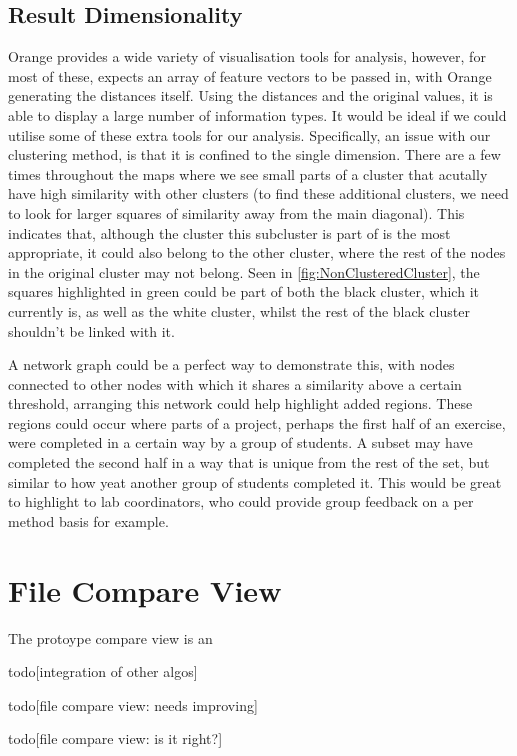 \subsection{Result Dimensionality}
\label{sec:VisTech}
Orange provides a wide variety of visualisation tools for analysis, however,
for most of these, expects an array of feature vectors to be passed in, with
Orange generating the distances itself. Using the distances and the original
values, it is able to display a large number of information types. It would be
ideal if we could utilise some of these extra tools for our analysis. Specifically,
an issue with our clustering method, is that it is confined to the single dimension.
There are a few times throughout the maps where we see small parts of a cluster
that acutally have high similarity with other clusters (to find these 
additional clusters, we need to look for larger squares of similarity away from
the main diagonal). This indicates that, although the cluster this subcluster
is part of is the most appropriate, it could also belong to the other cluster,
where the rest of the nodes in the original cluster may not belong. Seen in
\cref{fig:NonClusteredCluster}, the squares highlighted in green could be part
of both the black cluster, which it currently is, as well as the white cluster,
whilst the rest of the black cluster shouldn't be linked with it. 

A network graph could be a perfect way to demonstrate this, with nodes connected
to other nodes with which it shares a similarity above a certain threshold,
arranging this network could help highlight added regions. These regions could
occur where parts of a project, perhaps the first half of an exercise, were
completed in a certain way by a group of students. A subset may have completed
the second half in a way that is unique from the rest of the set, but similar
to how yeat another group of students completed it. This would be great to
highlight to lab coordinators, who could provide group feedback on a per method
basis for example.

\section{File Compare View}
The protoype compare view is an 

todo[integration of other algos]

todo[file compare view: needs improving]

todo[file compare view: is it right?]